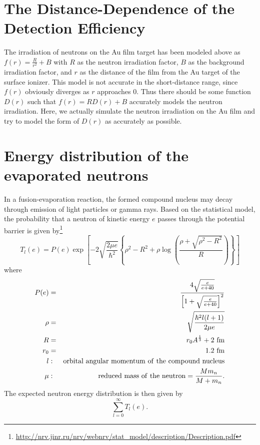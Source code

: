 \documentclass{article}
\begin{document}
\section{The Distance-Dependence of the Detection Efficiency}
The irradiation of neutrons on the Au film target has been modeled above as $f(r) = \frac{R}{r^2} + B$ with $R$ as the neutron irradiation factor, $B$ as the background irradiation factor, and $r$ as the distance of the film from the Au target of the surface ionizer. This model is not accurate in the short-distance range, since $f(r)$ obviously diverges as $r$ approaches 0. Thus there should be some function $D(r)$ such that $f(r) = RD(r) + B$ accurately models the neutron irradiation. Here, we actually simulate the neutron irradiation on the Au film and try to model the form of $D(r)$ as accurately as possible.

\section{Energy distribution of the evaporated neutrons}

In a fusion-evaporation reaction, the formed compound nucleus may decay through emission of light particles or gamma rays.
Based on the statistical model, the probability that a neutron of kinetic energy $e$ passes through the potential barrier is given by\footnote{\url{http://nrv.jinr.ru/nrv/webnrv/stat_model/description/Description.pdf}}
$$
T_l(e) = P(e) \exp{\left[ -2\sqrt{\frac{2\mu e}{\hbar^2}} \left\{ \rho^2 -R^2 + \rho\log{\left( \frac{\rho+\sqrt{\rho^2-R^2}}{R} \right)} \right\} \right]}
$$
where
\begin{eqnarray*}
    P(e) & = & \frac{4\sqrt{\frac{e}{e+40}}}{\left[1+\sqrt{\frac{e}{e+40}}\right]^2} \\
    \rho & = & \sqrt{\frac{\hbar^2l(l+1)}{2\mu e}} \\
    R & = & r_0A^\frac{1}{3} + 2~{\rm fm} \\
    r_0 & = & 1.2~{\rm fm} \\
    l & : & {\rm orbital}~{\rm angular}~{\rm momentum}~{\rm of}~{\rm the}~{\rm compound}~{\rm nucleus} \\
    \mu & : & {\rm reduced}~{\rm mass}~{\rm of}~{\rm the}~{\rm neutron} = \frac{Mm_n}{M + m_n}.
\end{eqnarray*}
The expected neutron energy distribution is then given by
$$
\sum_{l=0}^{\infty} T_l(e).
$$
\end{document}

